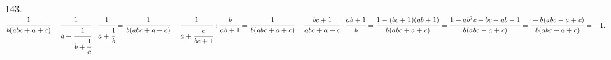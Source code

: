 143. $\cfrac{1}{b(abc+a+c)}-\cfrac{1}{a+\cfrac{1}{b+\cfrac{1}{c}}}:\cfrac{1}{a+\cfrac{1}{b}}=
\cfrac{1}{b(abc+a+c)}-\cfrac{1}{a+\cfrac{c}{bc+1}}:\cfrac{b}{ab+1}=
\cfrac{1}{b(abc+a+c)}-\cfrac{bc+1}{abc+a+c}\cdot\cfrac{ab+1}{b}=\cfrac{1-(bc+1)(ab+1)}{b(abc+a+c)}=\cfrac{1-ab^2c-bc-ab-1}{b(abc+a+c)}=
\cfrac{-b(abc+a+c)}{b(abc+a+c)}=-1.$\\
